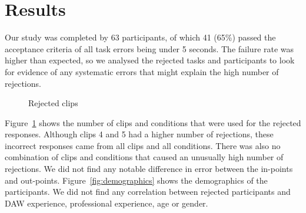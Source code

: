 
\section{Results}\label{sec:vis-results}
Our study was completed by 63 participants, of which 41 (65\%) passed the acceptance criteria of all task errors being
under 5 seconds. The failure rate was higher than expected, so we analysed the rejected tasks and participants to look
for evidence of any systematic errors that might explain the high number of rejections.

\begin{figure}[t]
\centering
  \caption{Rejected clips}
  \label{fig:rejected-clips}
\end{figure}

Figure~\ref{fig:rejected-clips} shows the number of clips and conditions that were used for the rejected responses.
Although clips 4 and 5 had a higher number of rejections, these incorrect responses came from all clips and all
conditions. There was also no combination of clips and conditions that caused an unusually high number of rejections.
We did not find any notable difference in error between the in-points and out-points.  Figure~\ref{fig:demographics}
shows the demographics of the participants.  We did not find any correlation between rejected participants and DAW
experience, professional experience, age or gender.

